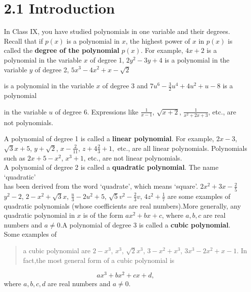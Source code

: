 \documentclass[12pt]{article}
\begin{document}
\section*{2.1 Introduction}
In Class IX, you have studied polynomials in one variable and their degrees. Recall that if \( p(x) \) is a polynomial in \( x \), the highest power of \( x \) in \( p(x) \) is called the \textbf{degree of the polynomial} \( p(x) \). For example, \( 4x + 2 \) is a polynomial in the variable \( x \) of degree 1, \( 2y^2 - 3y + 4 \) is a polynomial in the variable \( y \) of degree 2, 
\( 5x^3 - 4x^2 + x - \sqrt{2} \) 
\begin{spacing}{2}
is a polynomial in the variable \( x \) of degree 3 and \( 7u^6 - \frac{3}{2}u^4 + 4u^2 + u - 8 \) is a polynomial

in the variable \( u \) of degree 6. Expressions like \( \frac{1}{x-1} \), \( \sqrt{x+2} \), \( \frac{1}{x^2 + 2x + 3} \), etc., are not polynomials.

\hspace{2em} A polynomial of degree 1 is called a \textbf{linear polynomial}. For example, 
\( 2x - 3 \), \( \sqrt{3}x + 5 \), \( y + \sqrt{2} \), \( x - \frac{2}{11} \), $z + 4\frac{2}{3} + 1 ,$ etc., are all linear polynomials. Polynomials \\such as \( 2x + 5 - x^2 \), \( x^3 + 1 \), etc., are not linear polynomials. \\
\vspace{-0.2em}
\hspace{2em}
A polynomial of degree 2 is called a \textbf{quadratic polynomial}. The name ‘quadratic’
\\has been derived from the word ‘quadrate’, which means ‘square’. 
\( 2x^2 + 3x - \frac{2}{5} \) \\
\vspace{0.5em}
\( y^2 - 2 \), \( 2 - x^2 + \sqrt{3}x \), 
\( \frac{u}{3} - 2u^2 + 5 \), \( \sqrt{5}v^2 - \frac{2}{3}v \), 
\( 4z^2 + \frac{1}{7} \) are some examples of 
\\quadratic polynomials (whose coefficients are real numbers).More generally, any quadratic polynomial in \( x \) is of the form \( ax^2 + bx + c \), where \( a, b, c \) are real numbers and \( a \neq 0 \).A polynomial of degree 3 is called a \textbf{cubic polynomial}. Some examples of 

\begin{quote}
    
a cubic polynomial are \( 2 - x^3 \), \( x^3 \), \( \sqrt{2}x^3 \), \( 3 - x^2 + x^3 \), \( 3x^3 - 2x^2 + x - 1 \). In fact,the most general form of a cubic polynomial is
\end{quote}
\end{spacing}
\vspace{-3em}
\[ax^3 + bx^2 + cx + d,\]
where \( a, b, c, d \) are real numbers and \( a \neq 0 \).
\end{document}
